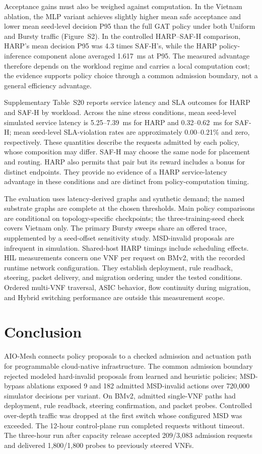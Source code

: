 \documentclass[final,5p]{elsarticle}
\newcommand{\rev}[1]{\textcolor{revisiongreen}{#1}}
\let\newrev\rev
\begin{document}
\newrev{Acceptance gains must also be weighed against computation. In the Vietnam ablation, the MLP variant achieves slightly higher mean safe acceptance and lower mean seed-level decision P95 than the full GAT policy under both Uniform and Bursty traffic (Figure~S2). In the controlled HARP--SAF-H comparison, HARP's mean decision P95 was 4.3 times SAF-H's, while the HARP policy-inference component alone averaged 1.617~ms at P95. The measured advantage therefore depends on the workload regime and carries a local computation cost; the evidence supports policy choice through a common admission boundary, not a general efficiency advantage.}

\newrev{Supplementary Table~S20 reports service latency and SLA outcomes for HARP and SAF-H by workload. Across the nine stress conditions, mean seed-level simulated service latency is 5.25--7.39~ms for HARP and 0.32--0.62~ms for SAF-H; mean seed-level SLA-violation rates are approximately 0.00--0.21\% and zero, respectively. These quantities describe the requests admitted by each policy, whose composition may differ. SAF-H may choose the same node for placement and routing. HARP also permits that pair but its reward includes a bonus for distinct endpoints. They provide no evidence of a HARP service-latency advantage in these conditions and are distinct from policy-computation timing.}

\newrev{The evaluation uses latency-derived graphs and synthetic demand; the named substrate graphs are complete at the chosen thresholds. Main policy comparisons are conditional on topology-specific checkpoints; the three-training-seed check covers Vietnam only. The primary Bursty sweeps share an offered trace, supplemented by a seed-offset sensitivity study. MSD-invalid proposals are infrequent in simulation. Shared-host HARP timings include scheduling effects. HIL measurements concern one VNF per request on BMv2, with the recorded runtime network configuration. They establish deployment, rule readback, steering, packet delivery, and migration ordering under the tested conditions. Ordered multi-VNF traversal, ASIC behavior, flow continuity during migration, and Hybrid switching performance are outside this measurement scope.}

\section{Conclusion}
\label{sec:conclusion}
\newrev{AIO-Mesh connects policy proposals to a checked admission and actuation path for programmable cloud-native infrastructure. The common admission boundary rejected modeled hard-invalid proposals from learned and heuristic policies; MSD-bypass ablations exposed 9 and 182 admitted MSD-invalid actions over 720,000 simulator decisions per variant. On BMv2, admitted single-VNF paths had deployment, rule readback, steering confirmation, and packet probes. Controlled over-depth traffic was dropped at the first switch whose configured MSD was exceeded. The 12-hour control-plane run completed \HILRequests{} requests without timeout. The three-hour run after capacity release accepted 209/3,083 admission requests and delivered 1,800/1,800 probes to previously steered VNFs.}
\end{document}
